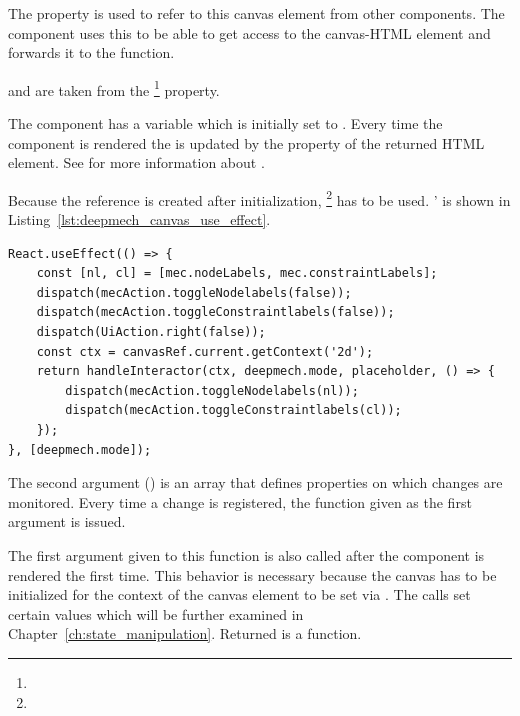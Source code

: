 The  property is used to refer to this canvas element from other components.
The  component uses this  to be able to get access to the canvas-HTML element and forwards it to the  function.

 and  are taken from the \footnote{} property.

The  component has a  variable which is initially set to .
Every time the  component is rendered the  is updated by the  property of the returned HTML element.
See  for more information about .

Because the reference is created after initialization,  \footnote{} has to be used.
'  is shown in Listing~\ref{lst:deepmech_canvas_use_effect}.

\begin{lstlisting}[label={lst:deepmech_canvas_use_effect}, caption={The \code{useEffect} function in the \code{DeepmechCanvas} component.}]
React.useEffect(() => {
    const [nl, cl] = [mec.nodeLabels, mec.constraintLabels];
    dispatch(mecAction.toggleNodelabels(false));
    dispatch(mecAction.toggleConstraintlabels(false));
    dispatch(UiAction.right(false));
    const ctx = canvasRef.current.getContext('2d');
    return handleInteractor(ctx, deepmech.mode, placeholder, () => {
        dispatch(mecAction.toggleNodelabels(nl));
        dispatch(mecAction.toggleConstraintlabels(cl));
    });
}, [deepmech.mode]);
\end{lstlisting}

The second argument () is an array that defines properties on which changes are monitored.
Every time a change is registered, the function given as the first argument is issued.

The first argument given to this function is also called after the component is rendered the first time.
This behavior is necessary because the canvas has to be initialized for the context of the canvas element to be set via .
The  calls set certain values which will be further examined in Chapter~\ref{ch:state_manipulation}.
Returned is a  function.

